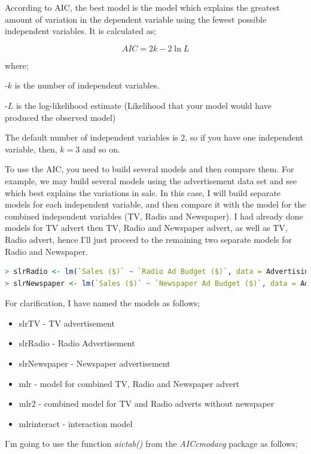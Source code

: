 \documentclass[
]{article}
\begin{document}
According to AIC, the best model is the model which explains the
greatest amount of variation in the dependent variable using the fewest
possible independent variables. It is calculated as;

\[AIC=2k-2\ln{L}\]

where;

-\(k\) is the number of independent variables.

-\(L\) is the log-likelihood estimate (Likelihood that your model would
have produced the observed model)

The default number of independent variables is 2, so if you have one
independent variable, then, \(k=3\) and so on.

To use the AIC, you need to build several models and then compare them.
For example, we may build several models using the advertisement data
set and see which best explains the variations in sale. In this case, I
will build separate models for each independent variable, and then
compare it with the model for the combined independent variables (TV,
Radio and Newspaper). I had already done models for TV advert then TV,
Radio and Newspaper advert, as well as TV, Radio advert, hence I'll just
proceed to the remaining two separate models for Radio and Newspaper.

\begin{lstlisting}[language=R]
> slrRadio <- lm(`Sales ($)` ~ `Radio Ad Budget ($)`, data = AdvertisingBudgetandSales)
> slrNewspaper <- lm(`Sales ($)` ~ `Newspaper Ad Budget ($)`, data = AdvertisingBudgetandSales)
\end{lstlisting}

For clarification, I have named the models as follows;

\begin{itemize}
\item
  slrTV - TV advertisement
\item
  slrRadio - Radio Advertisement
\item
  slrNewspaper - Newspaper advertisement
\item
  mlr - model for combined TV, Radio and Newspaper advert
\item
  mlr2 - combined model for TV and Radio adverts without newspaper
\item
  mlrinteract - interaction model
\end{itemize}

I'm going to use the function \emph{aictab()} from the \emph{AICcmodavg}
package as follows;
\end{document}
